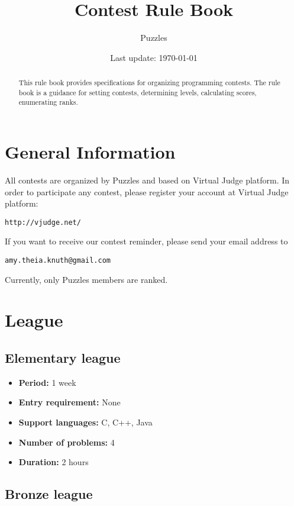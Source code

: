 \documentclass{article}
\title{\textbf{Contest Rule Book}}
\author{Puzzles}
\date{Last update: \today}
\begin{document}
\maketitle

\begin{abstract}
This rule book provides specifications for organizing programming contests. The rule book is a guidance for setting contests, determining levels, calculating scores, enumerating ranks.
\end{abstract}

\tableofcontents

\section{General Information}

All contests are organized by Puzzles and based on Virtual Judge platform. In order to participate any contest, please register your account at Virtual Judge platform:
\begin{verbatim}
http://vjudge.net/
\end{verbatim}
If you want to receive our contest reminder, please send your email address to
\begin{verbatim}
amy.theia.knuth@gmail.com
\end{verbatim}

Currently, only Puzzles members are ranked.

\section{League}

\subsection{Elementary league}

\begin{itemize}
	\item \textbf{Period:} 1 week
	\item \textbf{Entry requirement:} None
	\item \textbf{Support languages:} C, C++, Java
	\item \textbf{Number of problems:} 4
	\item \textbf{Duration:} 2 hours
\end{itemize}

\subsection{Bronze league}
\end{document}
